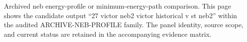 Archived neb energy-profile or minimum-energy-path comparison. This page shows the candidate output ``27 victor neb2 victor historical v st neb2'' within the audited ARCHIVE-NEB-PROFILE family. The panel identity, source scope, and current status are retained in the accompanying evidence matrix.
